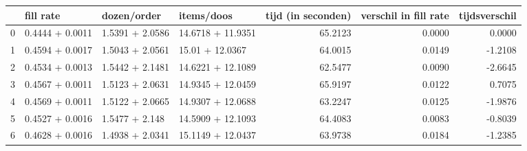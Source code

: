 \begin{tabular}{llllrrr}
\toprule
{} &        fill rate &      dozen/order &         items/doos &  tijd (in seconden) &  verschil in fill rate &  tijdsverschil \\
\midrule
0 &  0.4444 + 0.0011 &  1.5391 + 2.0586 &  14.6718 + 11.9351 &             65.2123 &                 0.0000 &         0.0000 \\
1 &  0.4594 + 0.0017 &  1.5043 + 2.0561 &    15.01 + 12.0367 &             64.0015 &                 0.0149 &        -1.2108 \\
2 &  0.4534 + 0.0013 &  1.5442 + 2.1481 &  14.6221 + 12.1089 &             62.5477 &                 0.0090 &        -2.6645 \\
3 &  0.4567 + 0.0011 &  1.5123 + 2.0631 &  14.9345 + 12.0459 &             65.9197 &                 0.0122 &         0.7075 \\
4 &  0.4569 + 0.0011 &  1.5122 + 2.0665 &  14.9307 + 12.0688 &             63.2247 &                 0.0125 &        -1.9876 \\
5 &  0.4527 + 0.0016 &   1.5477 + 2.148 &  14.5909 + 12.1093 &             64.4083 &                 0.0083 &        -0.8039 \\
6 &  0.4628 + 0.0016 &  1.4938 + 2.0341 &  15.1149 + 12.0437 &             63.9738 &                 0.0184 &        -1.2385 \\
\bottomrule
\end{tabular}
